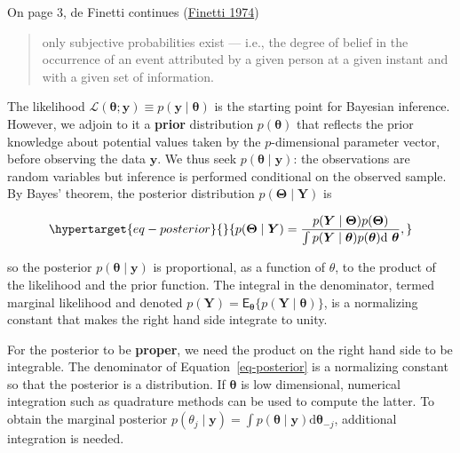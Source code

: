 \documentclass[
  11pt,
  letterpaper,
]{scrbook}
\theoremstyle{definition}
\theoremstyle{remark}
\begin{document}
On page 3, de Finetti continues
(\protect\hyperlink{ref-deFinetti:1974}{Finetti 1974})

\begin{quote}
only subjective probabilities exist --- i.e., the degree of belief in
the occurrence of an event attributed by a given person at a given
instant and with a given set of information.
\end{quote}

The likelihood
\(\mathcal{L}(\boldsymbol{\theta}; \boldsymbol{y}) \equiv p(\boldsymbol{y} \mid \boldsymbol{\theta})\)
is the starting point for Bayesian inference. However, we adjoin to it a
\textbf{prior} distribution \(p(\boldsymbol{\theta})\) that reflects the
prior knowledge about potential values taken by the \(p\)-dimensional
parameter vector, before observing the data \(\boldsymbol{y}\). We thus
seek \(p(\boldsymbol{\theta} \mid \boldsymbol{y})\): the observations
are random variables but inference is performed conditional on the
observed sample. By Bayes' theorem, the posterior distribution
\(p(\boldsymbol{\Theta} \mid \boldsymbol{Y})\) is

\begin{equation}\protect\hypertarget{eq-posterior}{}{
p(\boldsymbol{\Theta} \mid \boldsymbol{Y}) = \frac{p(\boldsymbol{Y} \mid \boldsymbol{\Theta}) p(\boldsymbol{\Theta})}{\int p(\boldsymbol{Y} \mid \boldsymbol{\theta}) p(\boldsymbol{\theta}) \mathrm{d}\ \boldsymbol{\theta}},
}\label{eq-posterior}\end{equation}

so the posterior \(p(\boldsymbol{\theta} \mid \boldsymbol{y})\) is
proportional, as a function of \(\theta\), to the product of the
likelihood and the prior function. The integral in the denominator,
termed marginal likelihood and denoted
\(p(\boldsymbol{Y}) = \mathsf{E}_{\boldsymbol{\theta}}\{p(\boldsymbol{Y} \mid \boldsymbol{\theta})\}\),
is a normalizing constant that makes the right hand side integrate to
unity.

For the posterior to be \textbf{proper}, we need the product on the
right hand side to be integrable. The denominator of
Equation~\ref{eq-posterior} is a normalizing constant so that the
posterior is a distribution. If \(\boldsymbol{\theta}\) is low
dimensional, numerical integration such as quadrature methods can be
used to compute the latter. To obtain the marginal posterior
\(p(\theta_j \mid \boldsymbol{y}) = \int p(\boldsymbol{\theta} \mid \boldsymbol{y}) \mathrm{d} \boldsymbol{\theta}_{-j}\),
additional integration is needed.
\end{document}
